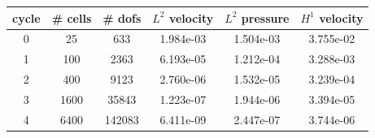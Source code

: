 \documentclass[10pt]{report}
\begin{document}
\begin{table}[H]
\begin{center}
\begin{tabular}{|c|c|c|c|c|c|} \hline
cycle & \# cells & \# dofs & $L^2$ velocity & $L^2$ pressure & $H^1$ velocity\\ \hline
0 & 25 & 633 & 1.984e-03 & 1.504e-03 & 3.755e-02\\ \hline
1 & 100 & 2363 & 6.193e-05 & 1.212e-04 & 3.288e-03\\ \hline
2 & 400 & 9123 & 2.760e-06 & 1.532e-05 & 3.239e-04\\ \hline
3 & 1600 & 35843 & 1.223e-07 & 1.944e-06 & 3.394e-05\\ \hline
4 & 6400 & 142083 & 6.411e-09 & 2.447e-07 & 3.744e-06\\ \hline
\end{tabular}
\end{center}
\end{table}
\end{document}
